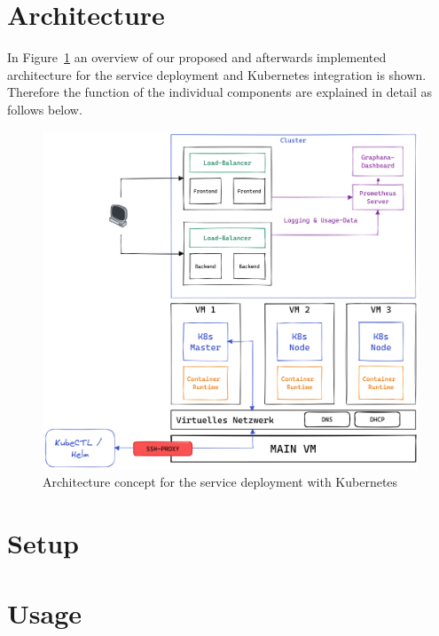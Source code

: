 \section{Architecture}
    In Figure~\ref{fig:Architecture} an overview of our proposed and afterwards implemented architecture for the service deployment and Kubernetes integration is shown. Therefore the function of the individual components are explained in detail as follows below.
    
    \begin{figure}[htbp]
        \includegraphics[width=15cm]{assets/architecture-overview.png}
        \centering
        \captionsetup{justification=centering, margin=1cm}
        \caption{Architecture concept for the service deployment with Kubernetes}
        \label{fig:Architecture}
    \end{figure}
\section{Setup}
    
\section{Usage}